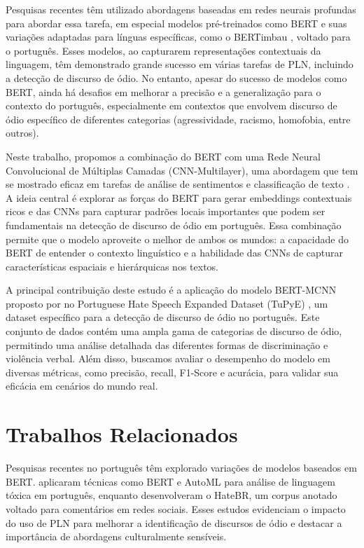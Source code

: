 \documentclass[sigconf,nonacm]{acmart}
\begin{document}
Pesquisas recentes têm utilizado abordagens baseadas em redes neurais profundas para abordar essa tarefa, em especial modelos pré-treinados como BERT \cite{devlin2019bertpretrainingdeepbidirectional} e suas variações adaptadas para línguas específicas, como o BERTimbau \cite{souza2020bertimbau}, voltado para o português. Esses modelos, ao capturarem representações contextuais da linguagem, têm demonstrado grande sucesso em várias tarefas de PLN, incluindo a detecção de discurso de ódio. No entanto, apesar do sucesso de modelos como BERT, ainda há desafios em melhorar a precisão e a generalização para o contexto do português, especialmente em contextos que envolvem discurso de ódio específico de diferentes categorias (agressividade, racismo, homofobia, entre outros).

Neste trabalho, propomos a combinação do BERT com uma Rede Neural Convolucional de Múltiplas Camadas (CNN-Multilayer), uma abordagem que tem se mostrado eficaz em tarefas de análise de sentimentos e classificação de texto \cite{oliveira2023tupye}. A ideia central é explorar as forças do BERT para gerar embeddings contextuais ricos e das CNNs para capturar padrões locais importantes que podem ser fundamentais na detecção de discurso de ódio em português. Essa combinação permite que o modelo aproveite o melhor de ambos os mundos: a capacidade do BERT de entender o contexto linguístico e a habilidade das CNNs de capturar características espaciais e hierárquicas nos textos.

A principal contribuição deste estudo é a aplicação do modelo BERT-MCNN proposto por \citeauthor{ATANDOH2023101578} no Portuguese Hate Speech Expanded Dataset (TuPyE) \cite{oliveira2023tupye}, um dataset específico para a detecção de discurso de ódio no português. Este conjunto de dados contém uma ampla gama de categorias de discurso de ódio, permitindo uma análise detalhada das diferentes formas de discriminação e violência verbal. Além disso, buscamos avaliar o desempenho do modelo em diversas métricas, como precisão, recall, F1-Score e acurácia, para validar sua eficácia em cenários do mundo real.

\section{Trabalhos Relacionados}

Pesquisas recentes no português têm explorado variações de modelos baseados em BERT. \cite{leite2020toxiclanguagedetectionsocial} aplicaram técnicas como BERT e AutoML para análise de linguagem tóxica em português, enquanto \cite{vargas-etal-2022-hatebr} desenvolveram o HateBR, um corpus anotado voltado para comentários em redes sociais. Esses estudos evidenciam o impacto do uso de PLN para melhorar a identificação de discursos de ódio e destacar a importância de abordagens culturalmente sensíveis.
\end{document}
